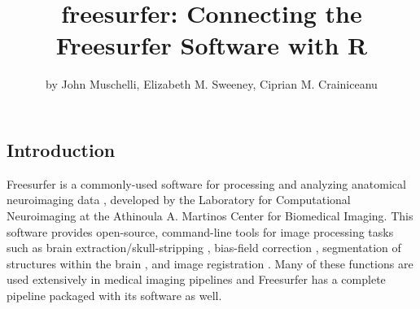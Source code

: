 \title{freesurfer: Connecting the Freesurfer Software with R}
\author{by John Muschelli, Elizabeth M. Sweeney, Ciprian M. Crainiceanu}

\maketitle


\subsection{Introduction}\label{introduction}

\label{sec:intro}

Freesurfer is a commonly-used software for processing and analyzing
anatomical neuroimaging data \citep{fischl2012freesurfer}, developed by
the Laboratory for Computational Neuroimaging at the Athinoula A.
Martinos Center for Biomedical Imaging. This software provides
open-source, command-line tools for image processing tasks such as brain
extraction/skull-stripping \citep{segonne2004hybrid}, bias-field
correction \citep{sled_nonparametric_1998}, segmentation of structures
within the brain \citep{fischl2002whole,fischl2004sequence}, and image
registration \citep{fischl1999high,reuter2010highly}. Many of these
functions are used extensively in medical imaging pipelines and
Freesurfer has a complete pipeline packaged with its software as well.

